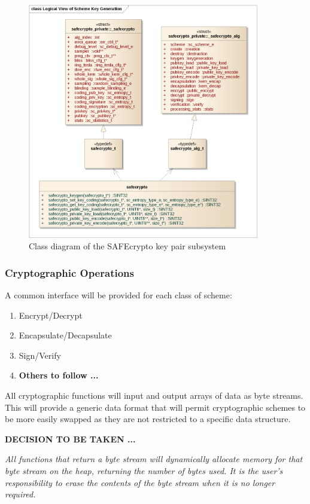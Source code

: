 \begin{figure}[!h]
\centering
\includegraphics[width=0.9\textwidth]{libsafecrypto_keys_logical_view.png}
\caption{Class diagram of the SAFEcrypto key pair subsystem}
\label{fig:safecrypto_key_pairs}
\end{figure}


\newpage
\subsubsection{Cryptographic Operations}

A common interface will be provided for each class of scheme:

\begin{enumerate}
\item Encrypt/Decrypt
\item Encapsulate/Decapsulate
\item Sign/Verify
\item \textbf{Others to follow ...}
\end{enumerate}

All cryptographic functions will input and output arrays of data as byte streams. This will provide a generic data format that will permit cryptographic schemes to be more easily swapped as they are not restricted to a specific data structure.

\textbf{DECISION TO BE TAKEN ...}

\textit{All functions that return a byte stream will dynamically allocate memory for that byte stream on the heap, returning the number of bytes used. It is the user's responsibility to erase the contents of the byte stream when it is no longer required.}


